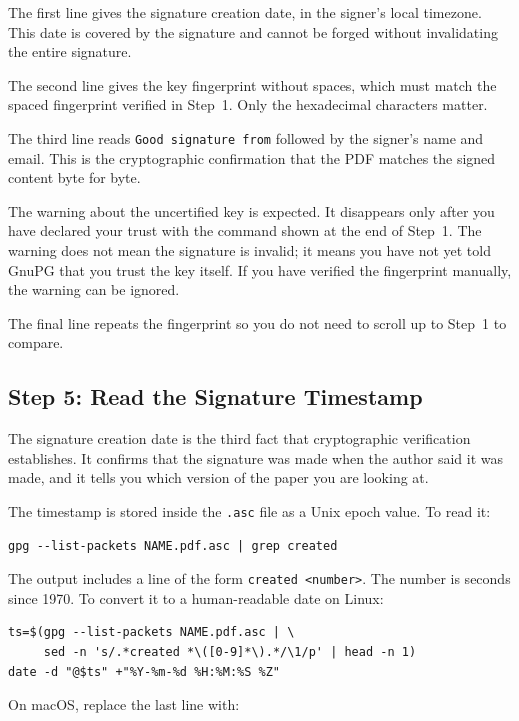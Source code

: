The first line gives the signature creation date, in the signer's
local timezone. This date is covered by the signature and cannot
be forged without invalidating the entire signature.

The second line gives the key fingerprint without spaces, which
must match the spaced fingerprint verified in Step~1. Only the
hexadecimal characters matter.

The third line reads \texttt{Good signature from} followed by the
signer's name and email. This is the cryptographic confirmation
that the PDF matches the signed content byte for byte.

The warning about the uncertified key is expected. It disappears
only after you have declared your trust with the command shown at
the end of Step~1. The warning does not mean the signature is
invalid; it means you have not yet told GnuPG that you trust the
key itself. If you have verified the fingerprint manually, the
warning can be ignored.

The final line repeats the fingerprint so you do not need to
scroll up to Step~1 to compare.

\subsection*{Step 5: Read the Signature Timestamp}

The signature creation date is the third fact that cryptographic
verification establishes. It confirms that the signature was made
when the author said it was made, and it tells you which version
of the paper you are looking at.

The timestamp is stored inside the \texttt{.asc} file as a Unix
epoch value. To read it:

\begin{lstlisting}[style=code]
gpg --list-packets NAME.pdf.asc | grep created
\end{lstlisting}

The output includes a line of the form \texttt{created <number>}.
The number is seconds since 1970. To convert it to a human-readable
date on Linux:

\begin{lstlisting}[style=code]
ts=$(gpg --list-packets NAME.pdf.asc | \
     sed -n 's/.*created *\([0-9]*\).*/\1/p' | head -n 1)
date -d "@$ts" +"%Y-%m-%d %H:%M:%S %Z"
\end{lstlisting}

On macOS, replace the last line with:

